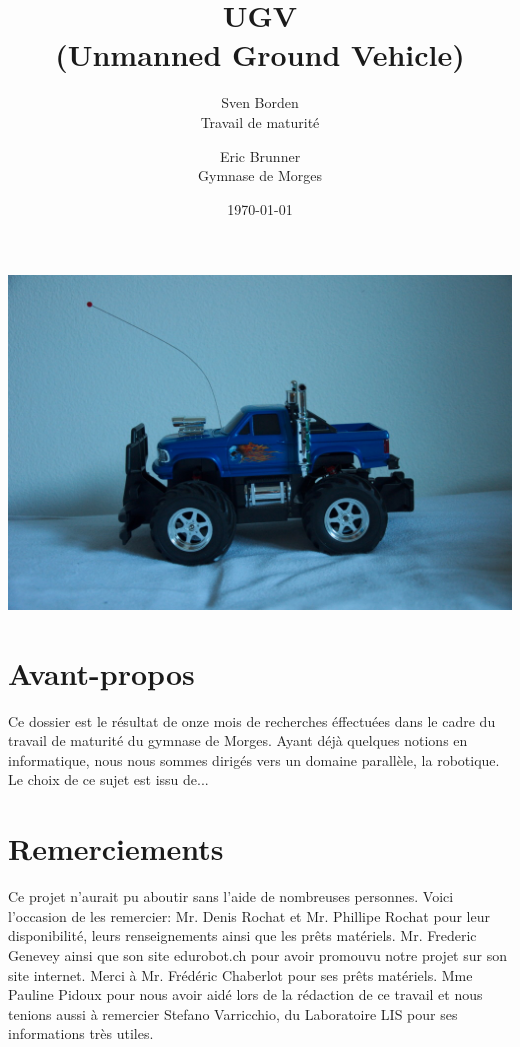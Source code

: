 \documentclass[a4paper,12pt]{report}
\begin{document}
{\selectfont %
\title{UGV \\(Unmanned Ground Vehicle)}
\author{Sven Borden\\ \small Travail de maturité \and  Eric Brunner\\ \small Gymnase de Morges}
\date{\today}
\maketitle

\begin{centering}
\includegraphics[width=1.0\textwidth]{DSC_8469res}
\end{centering}

\clearpage


\section*{Avant-propos}

Ce dossier est le résultat de onze mois de recherches éffectuées dans le cadre du travail de maturité du gymnase de Morges. Ayant déjà quelques notions en informatique, nous nous sommes dirigés  vers un domaine parallèle, la robotique. Le choix de ce sujet est issu de...

\clearpage

\section*{Remerciements}
Ce projet n'aurait pu aboutir sans l'aide de nombreuses personnes. Voici l'occasion de les remercier: Mr. Denis Rochat et Mr. Phillipe Rochat pour leur disponibilité, leurs renseignements ainsi que les prêts matériels. Mr. Frederic Genevey ainsi que son site edurobot.ch pour avoir promouvu notre projet sur son site internet. Merci à Mr. Frédéric Chaberlot pour ses prêts matériels. Mme Pauline Pidoux pour nous avoir aidé lors de la rédaction de ce travail et nous tenions aussi à remercier Stefano Varricchio, du Laboratoire LIS pour ses informations très utiles.

}
\end{document}
